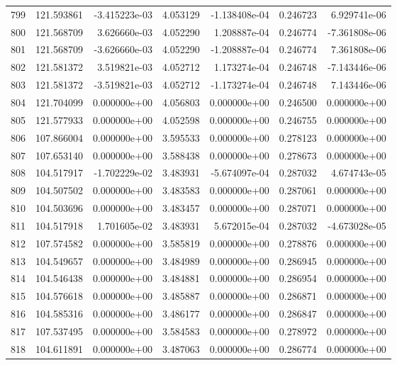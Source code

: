 \begin{tabular}{rrrrrrr}
 799 & 121.593861 & -3.415223e-03 &  4.053129 & -1.138408e-04 &   0.246723 &  6.929741e-06 \\
 800 & 121.568709 &  3.626660e-03 &  4.052290 &  1.208887e-04 &   0.246774 & -7.361808e-06 \\
 801 & 121.568709 & -3.626660e-03 &  4.052290 & -1.208887e-04 &   0.246774 &  7.361808e-06 \\
 802 & 121.581372 &  3.519821e-03 &  4.052712 &  1.173274e-04 &   0.246748 & -7.143446e-06 \\
 803 & 121.581372 & -3.519821e-03 &  4.052712 & -1.173274e-04 &   0.246748 &  7.143446e-06 \\
 804 & 121.704099 &  0.000000e+00 &  4.056803 &  0.000000e+00 &   0.246500 &  0.000000e+00 \\
 805 & 121.577933 &  0.000000e+00 &  4.052598 &  0.000000e+00 &   0.246755 &  0.000000e+00 \\
 806 & 107.866004 &  0.000000e+00 &  3.595533 &  0.000000e+00 &   0.278123 &  0.000000e+00 \\
 807 & 107.653140 &  0.000000e+00 &  3.588438 &  0.000000e+00 &   0.278673 &  0.000000e+00 \\
 808 & 104.517917 & -1.702229e-02 &  3.483931 & -5.674097e-04 &   0.287032 &  4.674743e-05 \\
 809 & 104.507502 &  0.000000e+00 &  3.483583 &  0.000000e+00 &   0.287061 &  0.000000e+00 \\
 810 & 104.503696 &  0.000000e+00 &  3.483457 &  0.000000e+00 &   0.287071 &  0.000000e+00 \\
 811 & 104.517918 &  1.701605e-02 &  3.483931 &  5.672015e-04 &   0.287032 & -4.673028e-05 \\
 812 & 107.574582 &  0.000000e+00 &  3.585819 &  0.000000e+00 &   0.278876 &  0.000000e+00 \\
 813 & 104.549657 &  0.000000e+00 &  3.484989 &  0.000000e+00 &   0.286945 &  0.000000e+00 \\
 814 & 104.546438 &  0.000000e+00 &  3.484881 &  0.000000e+00 &   0.286954 &  0.000000e+00 \\
 815 & 104.576618 &  0.000000e+00 &  3.485887 &  0.000000e+00 &   0.286871 &  0.000000e+00 \\
 816 & 104.585316 &  0.000000e+00 &  3.486177 &  0.000000e+00 &   0.286847 &  0.000000e+00 \\
 817 & 107.537495 &  0.000000e+00 &  3.584583 &  0.000000e+00 &   0.278972 &  0.000000e+00 \\
 818 & 104.611891 &  0.000000e+00 &  3.487063 &  0.000000e+00 &   0.286774 &  0.000000e+00 \\

\end{tabular}
